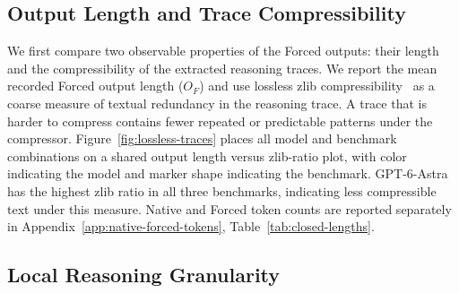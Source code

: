 \documentclass[10pt,letterpaper]{article}
\begin{document}


\subsection{Output Length and Trace Compressibility }
We first compare two observable properties of the Forced outputs:
their length and the compressibility of the extracted reasoning traces.
We report the mean recorded Forced output length ($O_F$) and use
lossless zlib compressibility~\citep{deutsch1996zlib} as a coarse measure of
textual redundancy in the reasoning trace.
A trace that is harder to compress contains fewer repeated or predictable
patterns under the compressor. Figure~\ref{fig:lossless-traces} places all model and benchmark combinations on a shared output length versus zlib-ratio plot, with color indicating the model and marker shape indicating the benchmark. GPT-6-Astra has the highest zlib ratio in all three benchmarks, indicating less compressible text under this measure. Native and Forced token counts are reported separately in Appendix~\ref{app:native-forced-tokens}, Table~\ref{tab:closed-lengths}.



\subsection{Local Reasoning Granularity}
\end{document}
